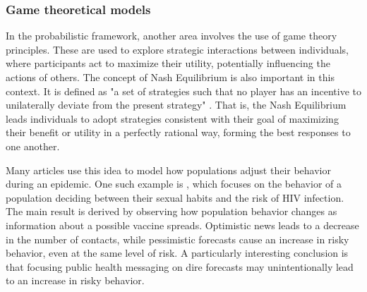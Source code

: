 \subsubsection{Game theoretical models}
In the probabilistic framework, another area involves the use of game theory principles. These are used to explore strategic interactions between individuals, where participants act to maximize their utility, potentially influencing the actions of others. The concept of Nash Equilibrium is also important in this context. It is defined as "a set of strategies such that no player has an incentive to unilaterally deviate from the present strategy" \cite{Wang_2015_review}. That is, the Nash Equilibrium leads individuals to adopt strategies consistent with their goal of maximizing their benefit or utility in a perfectly rational way, forming the best responses to one another.

Many articles use this idea to model how populations adjust their behavior during an epidemic. One such example is  \cite{Auld_2003}, which focuses on the behavior of a population deciding between their sexual habits and the risk of HIV infection. The main result is derived by observing how population behavior changes as information about a possible vaccine spreads. Optimistic news leads to a decrease in the number of contacts, while pessimistic forecasts cause an increase in risky behavior, even at the same level of risk. A particularly interesting conclusion is that focusing public health messaging on dire forecasts may unintentionally lead to an increase in risky behavior.

